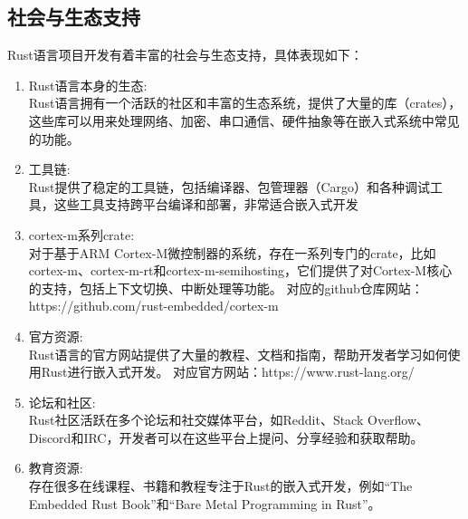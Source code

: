 \documentclass{ctexart}
\begin{document}
\subsection{社会与生态支持}
Rust语言项目开发有着丰富的社会与生态支持，具体表现如下：
\begin{enumerate}
\item Rust语言本身的生态:\\
Rust语言拥有一个活跃的社区和丰富的生态系统，提供了大量的库（crates），这些库可以用来处理网络、加密、串口通信、硬件抽象等在嵌入式系统中常见的功能。
\item 工具链:\\
Rust提供了稳定的工具链，包括编译器、包管理器（Cargo）和各种调试工具，这些工具支持跨平台编译和部署，非常适合嵌入式开发
\item cortex-m系列crate:\\
对于基于ARM Cortex-M微控制器的系统，存在一系列专门的crate，比如cortex-m、cortex-m-rt和cortex-m-semihosting，它们提供了对Cortex-M核心的支持，包括上下文切换、中断处理等功能。
对应的github仓库网站：https://github.com/rust-embedded/cortex-m
\item 官方资源:\\
Rust语言的官方网站提供了大量的教程、文档和指南，帮助开发者学习如何使用Rust进行嵌入式开发。
对应官方网站：https://www.rust-lang.org/
\item 论坛和社区:\\
Rust社区活跃在多个论坛和社交媒体平台，如Reddit、Stack Overflow、Discord和IRC，开发者可以在这些平台上提问、分享经验和获取帮助。
\item 教育资源:\\
存在很多在线课程、书籍和教程专注于Rust的嵌入式开发，例如“The Embedded Rust Book”和“Bare Metal Programming in Rust”。
\end{enumerate}
\end{document}
